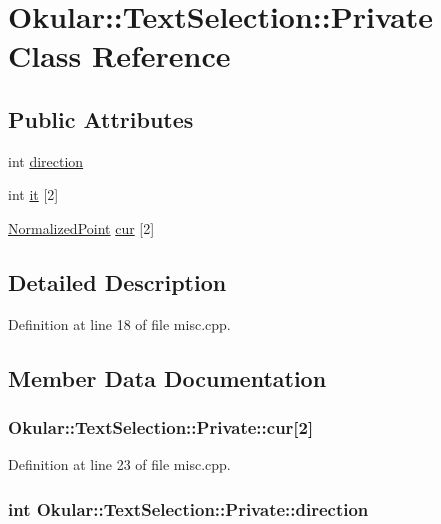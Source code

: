 \hypertarget{classTextSelection_1_1Private}{\section{Okular\+:\+:Text\+Selection\+:\+:Private Class Reference}
\label{classTextSelection_1_1Private}
}
\subsection*{Public Attributes}
\begin{DoxyCompactItemize}
\item 
int \hyperlink{classTextSelection_1_1Private_a66ca75a24063e09202470d53637479d4}{direction}
\item 
int \hyperlink{classTextSelection_1_1Private_a6799836d63bfdf108cf1c52f1cf53933}{it} \mbox{[}2\mbox{]}
\item 
\hyperlink{classOkular_1_1NormalizedPoint}{Normalized\+Point} \hyperlink{classTextSelection_1_1Private_afce96f4d37bf8b8846242be404eff4ef}{cur} \mbox{[}2\mbox{]}
\end{DoxyCompactItemize}


\subsection{Detailed Description}


Definition at line 18 of file misc.\+cpp.



\subsection{Member Data Documentation}
\hypertarget{classTextSelection_1_1Private_afce96f4d37bf8b8846242be404eff4ef}{
\subsubsection[{cur}]{ Okular\+::\+Text\+Selection\+::\+Private\+::cur\mbox{[}2\mbox{]}}}\label{classTextSelection_1_1Private_afce96f4d37bf8b8846242be404eff4ef}


Definition at line 23 of file misc.\+cpp.

\hypertarget{classTextSelection_1_1Private_a66ca75a24063e09202470d53637479d4}{
\subsubsection[{direction}]{\setlength{\rightskip}{0pt plus 5cm}int Okular\+::\+Text\+Selection\+::\+Private\+::direction}}\label{classTextSelection_1_1Private_a66ca75a24063e09202470d53637479d4}


